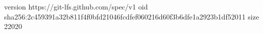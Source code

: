 version https://git-lfs.github.com/spec/v1
oid sha256:2c459391a32b811f4f0bfd21046fcdfef060216d60f3b6dfe1a2923b1df52011
size 22020
